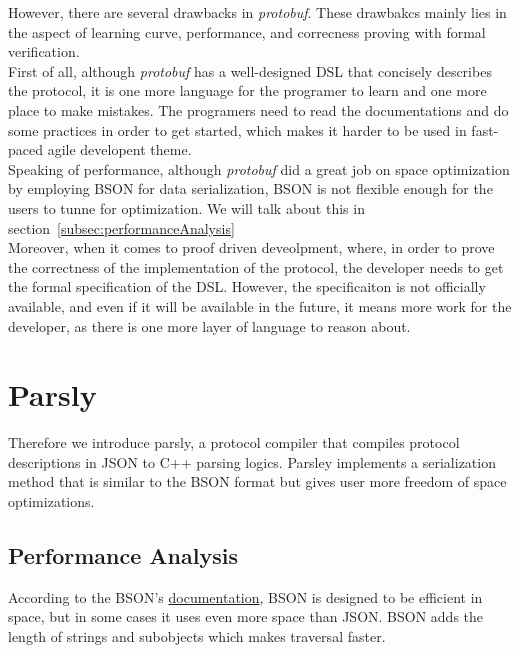 \documentclass{article}
\begin{document}
However, there are several drawbacks in \textit{protobuf}. These drawbakcs mainly lies in the aspect of learning curve, performance, and correcness proving with formal verification.\\

First of all, although \textit{protobuf} has a well-designed DSL that concisely describes the protocol, it is one more language for the programer to learn and one more place to make mistakes. The programers need to read the documentations and do some practices in order to get started, which makes it harder to be used in fast-paced agile developent theme.\\

Speaking of performance, although \textit{protobuf} did a great job on space optimization by employing BSON for data serialization, BSON is not flexible enough for the users to tunne for optimization. We will talk about this in section~\ref{subsec:performanceAnalysis} \\

Moreover, when it comes to proof driven deveolpment, where, in order to prove the correctness of the implementation of the protocol, the developer needs to get the formal specification of the DSL. However, the specificaiton is not officially available, and even if it will be available in the future, it means more work for the developer, as there is one more layer of language to reason about. \\


\section{Parsly}
Therefore we introduce parsly, a protocol compiler that compiles protocol descriptions in JSON to C++ parsing logics. Parsley implements a serialization method that is similar to the BSON format but gives user more freedom of space optimizations. 

\label{subsec:performanceAnalysis}
\subsection{Performance Analysis}
According to the BSON's \href{http://bsonspec.org}{documentation}, BSON is designed to be efficient in space, but in some cases it uses even more space than JSON. BSON adds the length of strings and subobjects which makes traversal faster.
\end{document}
